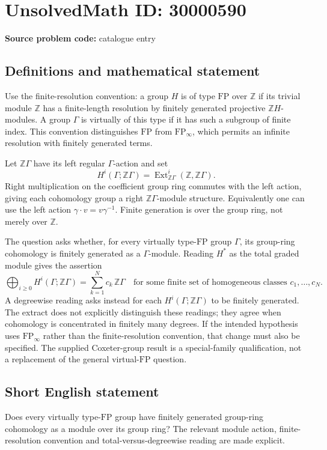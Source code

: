 \documentclass[11pt]{article}
\newcommand{\Z}{\mathbb{Z}}
\begin{document}
\section*{UnsolvedMath ID: 30000590}
\textbf{Source problem code:} catalogue entry
\subsection{Definitions and mathematical statement}
Use the finite-resolution convention: a group $H$ is of type $\mathrm{FP}$ over $\Z$ if its trivial module $\Z$ has a finite-length resolution by finitely generated projective $\Z H$-modules. A group $\Gamma$ is virtually of this type if it has such a subgroup of finite index. This convention distinguishes $\mathrm{FP}$ from $\mathrm{FP}_\infty$, which permits an infinite resolution with finitely generated terms.

Let $\Z\Gamma$ have its left regular $\Gamma$-action and set
\[
H^i(\Gamma;\Z\Gamma)=\operatorname{Ext}^i_{\Z\Gamma}(\Z,\Z\Gamma).
\]
Right multiplication on the coefficient group ring commutes with the left action, giving each cohomology group a right $\Z\Gamma$-module structure. Equivalently one can use the left action $\gamma\cdot v=v\gamma^{-1}$. Finite generation is over the group ring, not merely over $\Z$.

The question asks whether, for every virtually type-$\mathrm{FP}$ group $\Gamma$, its group-ring cohomology is finitely generated as a $\Gamma$-module. Reading $H^*$ as the total graded module gives the assertion
\[
\bigoplus_{i\geq0}H^i(\Gamma;\Z\Gamma)
=\sum_{k=1}^{N}c_k\,\Z\Gamma
\quad\text{for some finite set of homogeneous classes }c_1,\ldots,c_N.
\]
A degreewise reading asks instead for each $H^i(\Gamma;\Z\Gamma)$ to be finitely generated. The extract does not explicitly distinguish these readings; they agree when cohomology is concentrated in finitely many degrees. If the intended hypothesis uses $\mathrm{FP}_\infty$ rather than the finite-resolution convention, that change must also be specified. The supplied Coxeter-group result is a special-family qualification, not a replacement of the general virtual-$\mathrm{FP}$ question.
\subsection{Short English statement}
Does every virtually type-$\mathrm{FP}$ group have finitely generated group-ring cohomology as a module over its group ring? The relevant module action, finite-resolution convention and total-versus-degreewise reading are made explicit.
\end{document}
